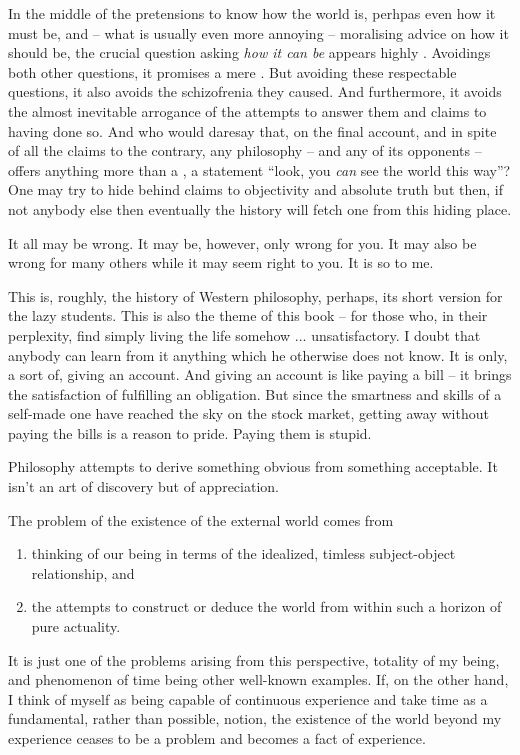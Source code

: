 {In the middle of the pretensions to know how the world is, perhpas even how 
it must be, and -- what 
is usually even more annoying -- moralising advice on how it should be, 
the crucial question asking {\em how it can be} appears highly
. Avoidings both other questions, it promises a mere 
. But avoiding these respectable questions, it 
also avoids the schizofrenia they caused. And furthermore, it avoids the almost 
inevitable arrogance of the attempts to answer them and claims to having 
done so. And who would daresay that, on the final account, and in spite of 
all the claims to the contrary, any philosophy -- and any of its 
opponents -- offers anything more than 
a , a statement ``look, you {\em can} see the world this 
way''? One may try to hide behind claims to objectivity and absolute truth 
but then, if not anybody else then eventually the history will fetch one 
from this hiding place.

\pa\label{pa:tomee}
It all may be wrong. It may be, however, only wrong for you. It may also be 
wrong for many others while it may seem right to you. It is so to me. 


\pa
This is, roughly, the history of Western philosophy, perhaps, its short 
version for the lazy students. This is also the theme of this book -- for 
those who, in their perplexity, find simply living the life somehow ...
unsatisfactory. I doubt that anybody can learn from it anything which he 
otherwise does not know. It is only, a sort of, giving an account. And giving an account is 
like paying a bill -- it brings the satisfaction of fulfilling an obligation. 
But since the smartness and skills of a self-made one have reached the
 sky on the stock market,
getting away without paying the bills is a reason to pride. Paying them is 
stupid. 

\pa
Philosophy attempts to derive something obvious from something acceptable. It
isn't an art of discovery but of appreciation.

\noindent\dotfill

The problem of the existence of the external world comes from
\begin{enumerate}\MyLPar
\item\label{sub-ob}
thinking of our being in terms of the idealized, timless subject-object
relationship, and 
\item\label{dedworld}
the attempts to construct or deduce the world from within such a horizon 
of pure actuality.
\end{enumerate}
It is just one of the problems arising from this perspective, totality of my being, 
and phenomenon of time being other well-known examples. If, on the other hand, 
I think of myself as being capable of continuous experience and take time as
a fundamental, rather than possible, notion, the existence of the world beyond
my experience ceases to be a problem and becomes a fact of experience.

}
